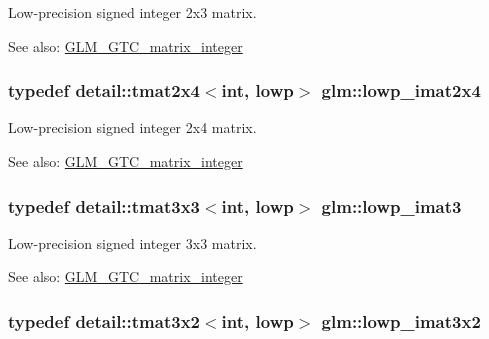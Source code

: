 Low-precision signed integer 2x3 matrix. \begin{Desc}
\item[See also:]\hyperlink{group__gtc__matrix__integer}{GLM\_\-GTC\_\-matrix\_\-integer} \end{Desc}
\hypertarget{group__gtc__matrix__integer_g4d859ef48cdfb15b2c9acc98064dd272}{
\subsubsection[lowp\_\-imat2x4]{\setlength{\rightskip}{0pt plus 5cm}typedef detail::tmat2x4$<$int, lowp$>$ {\bf glm::lowp\_\-imat2x4}}}
\label{group__gtc__matrix__integer_g4d859ef48cdfb15b2c9acc98064dd272}


Low-precision signed integer 2x4 matrix. \begin{Desc}
\item[See also:]\hyperlink{group__gtc__matrix__integer}{GLM\_\-GTC\_\-matrix\_\-integer} \end{Desc}
\hypertarget{group__gtc__matrix__integer_g149b90591e7275193c85cc08acbf0024}{
\subsubsection[lowp\_\-imat3]{\setlength{\rightskip}{0pt plus 5cm}typedef detail::tmat3x3$<$int, lowp$>$ {\bf glm::lowp\_\-imat3}}}
\label{group__gtc__matrix__integer_g149b90591e7275193c85cc08acbf0024}


Low-precision signed integer 3x3 matrix. \begin{Desc}
\item[See also:]\hyperlink{group__gtc__matrix__integer}{GLM\_\-GTC\_\-matrix\_\-integer} \end{Desc}
\hypertarget{group__gtc__matrix__integer_g250780f2be05f698b881b04ba7ce0452}{
\subsubsection[lowp\_\-imat3x2]{\setlength{\rightskip}{0pt plus 5cm}typedef detail::tmat3x2$<$int, lowp$>$ {\bf glm::lowp\_\-imat3x2}}}
\label{group__gtc__matrix__integer_g250780f2be05f698b881b04ba7ce0452}


